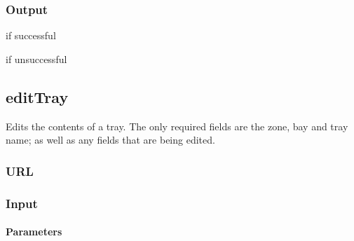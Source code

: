 \documentclass[letterpaper,10pt,english]{sphinxmanual}
\let\oldsubsection\subsection
\renewcommand{\subsection}{\needspace{6\baselineskip}\oldsubsection}
\begin{document}
\subsubsection{Output}
\label{\detokenize{docs/Developer/switchTray:output}}
 if successful

 if unsuccessful


\subsection{editTray}
\label{\detokenize{docs/Developer/editTray:edittray}}\label{\detokenize{docs/Developer/editTray::doc}}
Edits the contents of a tray. The only required fields are the zone, bay
and tray name; as well as any fields that are being edited.


\subsubsection{URL}
\label{\detokenize{docs/Developer/editTray:url}}


\subsubsection{Input}
\label{\detokenize{docs/Developer/editTray:input}}
\begin{sphinxVerbatim}[commandchars=\\\{\}]
   
   
   
   
   
   
\end{sphinxVerbatim}


\paragraph{Parameters}
\label{\detokenize{docs/Developer/editTray:parameters}}
\end{document}
